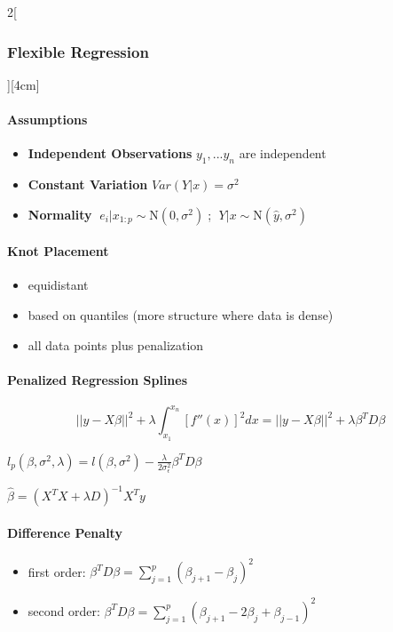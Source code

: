 \documentclass[8pt]{extarticle}
\begin{document}
\begin{multicols}{2}[\subsubsection{Flexible Regression}][4cm]


\paragraph{Assumptions}

\begin{itemize}
\item \textbf{Independent Observations} $y_1,...y_n$ are independent
\item \textbf{Constant Variation} $Var(Y|x) = \sigma^2$
\item \textbf{Normality} $\;e_i|x_{1:p} \sim \mathrm{N}(0,\sigma^2)\;$; $\;Y|x \sim \mathrm{N}(\hat{y},\sigma^2)\;$
\end{itemize}

\paragraph{Knot Placement}

\begin{itemize}
\item equidistant
\item based on quantiles (more structure where data is dense)
\item all data points plus penalization
\end{itemize}


\paragraph{Penalized Regression Splines}

$$|| y {-} X\beta||^2 + \lambda \int_{x_1}^{x_n} \left[ f''(x)\right]^2dx= || y {-} X\beta||^2 + \lambda \beta^TD \beta$$

$l_p(\beta,\sigma^2,\lambda) =  l(\beta,\sigma^2) - \frac{\lambda}{2\sigma_\epsilon^2} \beta^T D\beta$

$\hat{\beta} = (X^TX+\lambda D)^{-1}X^Ty$

\paragraph{Difference Penalty} 

\begin{itemize}
\item first order: $\beta^T D\beta = \sum_{j=1}^p (\beta_{j+1} - \beta_j)^2$
\item second order: $\beta^T D\beta = \sum_{j=1}^p (\beta_{j+1} - 2\beta_j + \beta_{j-1})^2$
\end{itemize}



\end{multicols}
\end{document}
